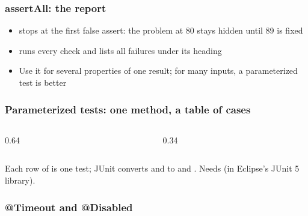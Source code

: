 \documentclass[aspectratio=169,10pt,compress]{beamer}
\begin{document}
\begin{frame}[t,fragile] \frametitle{assertAll: the report}

	\begin{itemize}\small
		\item {} stops at the first false assert: the problem at 80 stays hidden until 89 is fixed
		\item {} runs every check and lists all failures under its heading
		\item Use it for several properties of one result; for many inputs, a parameterized test is better
	\end{itemize}
\end{frame}




\begin{frame}[t,fragile] \frametitle{Parameterized tests: one method, a table of cases}
	\begin{columns}[T]
		\begin{column}{0.64\textwidth}
		\end{column}
		\begin{column}{0.34\textwidth}
			\uncover<2->{\lstoutput[basicstyle=\ttfamily\fontsize{6}{7.2}\selectfont, firstline=3]{codeoutput/Param.txt}}
		\end{column}
	\end{columns}

	\footnotesize Each row of  is one test; JUnit converts  and  to  and .
	Needs  (in Eclipse's JUnit 5 library).
\end{frame}




\begin{frame}[t,fragile] \frametitle{@Timeout and @Disabled}
\end{frame}
\end{document}
